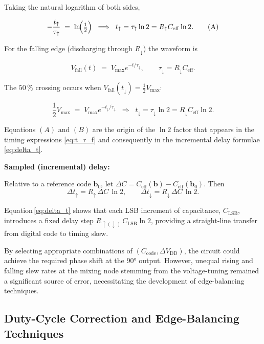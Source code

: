 Taking the natural logarithm of both sides,

\[
-\frac{t_{\uparrow}}{\tau_{\uparrow}}
      \;=\;
      \ln\!\Bigl(\tfrac{1}{2}\Bigr)
\;\;\Longrightarrow\;\;
t_{\uparrow}= \tau_{\uparrow}\ln 2
            = R_{\uparrow}C_{\mathrm{eff}}\ln 2.
\tag{A}
\]

For the falling edge (discharging through \(R_{\downarrow}\)) the
waveform is

\[
V_\text{fall}(t) \;=\; V_{\max}e^{-t/\tau_{\downarrow}},
\qquad
\tau_{\downarrow}=R_{\downarrow}C_{\mathrm{eff}}.
\]

The \(50\,\%\) crossing occurs when \(V_\text{fall}(t_{\downarrow}) =
\tfrac{1}{2}V_{\max}\):

\[
\frac{1}{2}V_{\max}
      \;=\;
      V_{\max}e^{-t_{\downarrow}/\tau_{\downarrow}}
\;\;\Longrightarrow\;\;
t_{\downarrow}= \tau_{\downarrow}\ln 2
              = R_{\downarrow}C_{\mathrm{eff}}\ln 2.
\tag{B}
\]

Equations \((A)\) and \((B)\) are the origin of the \(\ln 2\) factor that
appears in the timing expressions \eqref{eq:t_r_f} and consequently in the
incremental delay formulae \eqref{eq:delta_t}.

\textbf{Sampled (incremental) delay:}

Relative to a reference code $\mathbf{b}_0$,
let $\Delta C = C_{\mathrm{eff}}(\mathbf{b}) -
                C_{\mathrm{eff}}(\mathbf{b}_0)$.
Then
\begin{equation}
\Delta t_{\uparrow} = R_{\uparrow}\,\Delta C\,\ln 2,
\qquad
\Delta t_{\downarrow}= R_{\downarrow}\,\Delta C\,\ln 2.
\label{eq:delta_t}
\end{equation}

Equation\,\eqref{eq:delta_t} shows that each LSB increment of
capacitance, $C_{\mathrm{LSB}}$, introduces a fixed delay step
$R_{\uparrow(\downarrow)}\,C_{\mathrm{LSB}}\ln 2$, providing a
straight‑line transfer from digital code to timing skew.


By selecting appropriate combinations of $(C_\text{code},\Delta V_\text{DD})$, the circuit could achieve the required phase shift at the \ang{90} output. However, unequal rising and falling slew rates at the mixing node stemming from the voltage-tuning remained a significant source of error, necessitating the development of edge-balancing techniques.

\subsection{Duty-Cycle Correction and Edge-Balancing Techniques}\label{sec:dcc}

